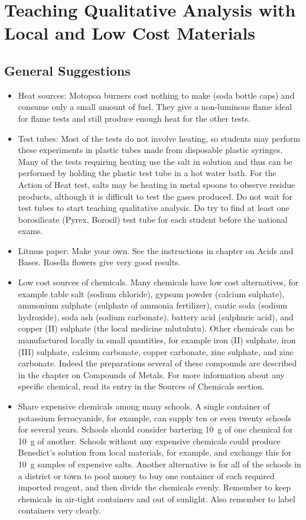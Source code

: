 \section{Teaching Qualitative Analysis with Local and Low Cost Materials}

\subsection{General Suggestions}
\begin{itemize}
\item{Heat sources: Motopoa burners cost nothing to make (soda bottle caps) and consume only a small amount of fuel. They give a non-luminous flame ideal for flame tests and still produce enough heat for the other tests.}
\item{Test tubes: Most of the tests do not involve heating, so students may perform these experiments in plastic tubes made from disposable plastic syringes. Many of the tests requiring heating use the salt in solution and thus can be performed by holding the plastic test tube in a hot water bath. For the Action of Heat test, salts may be heating in metal spoons to observe residue products, although it is difficult to test the gases produced. Do not wait for test tubes to start teaching qualitative analysis. Do try to find at least one borosilicate (Pyrex, 
Borosil) test tube for each student before the national exams.}
\item{Litmus paper: Make your own. See the instructions in chapter on Acids and Bases. Rosella flowers give very good results.}
\item{Low cost sources of chemicals. Many chemicals have low cost alternatives, for example table salt (sodium chloride), gypsum powder (calcium sulphate), ammonium sulphate (sulphate of ammonia fertilizer), cautic soda (sodium hydroxide), soda ash (sodium carbonate), battery acid (sulphuric acid), and copper (II) sulphate (the local medicine mlutulutu). Other chemicals can be manufactured locally in small quantities, for example iron (II) sulphate, iron (III) sulphate, calcium carbonate, copper carbonate, zinc sulphate, and zinc carbonate. Indeed the preparations several of these compounds are described in the chapter on Compounds of Metals. For more information about any specific chemical, read its entry in the Sources of Chemicals section.}
\item{Share expensive chemicals among many schools. A single container of potassium ferrocyanide, for example, can supply ten or even twenty schools for several years. Schools should consider bartering 10~g of one chemical for 10~g of another. Schools without any expensive chemicals could produce Benedict's solution from local materials, for example, and exchange this for 10~g samples of expensive salts. Another alternative is for all of the schools in a district or town to pool money to buy one container of each required imported reagent, and then divide the chemicals evenly. Remember to keep chemicals in air-tight containers and out of sunlight. Also remember to label containers very clearly.}
\end{itemize} 

